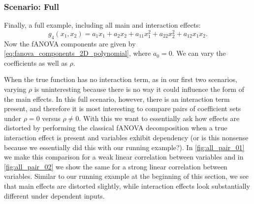 \subsubsection{Scenario: Full}
Finally, a full example, including all main and interaction effects:
$$g_4(x_1, x_2) = a_1 x_1 + a_2 x_2 + a_{11} x_1^2 + a_{22} x_2^2 + a_{12} x_1 x_2.$$
Now the fANOVA components are given by \autoref{eq:fanova_components_2D_polynomial}, where $a_0 = 0$.
We can vary the coefficients as well as $\rho$.\par
When the true function has no interaction term, as in our first two scenarios, varying $\rho$ is uninteresting because there is no way it could influence the form of the main effects. In this full scenario, however, there is an interaction term present, and therefore it is most interesting to compare pairs of coefficient sets under $\rho = 0$ versus $\rho \neq 0$. With this we want to essentially ask how effects are distorted by performing the classical fANOVA decomposition when a true interaction effect is present and variables exhibit dependency (or is this nonsense because we essentially did this with our running example?).
In \autoref{fig:all_pair_01} we make this comparison for a weak linear correlation between variables and in \autoref{fig:all_pair_02} we show the same for a strong linear correlation between variables. Similar to our running example at the beginning of this section, we see that main effects are distorted slightly, while interaction effects look substantially different under dependent inputs.

